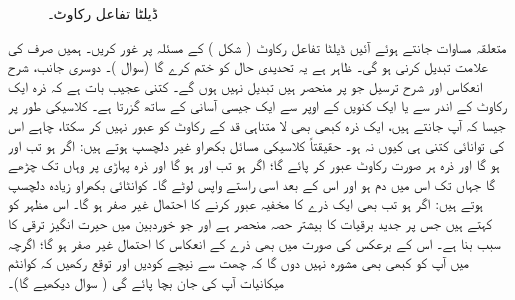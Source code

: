  \begin{figure}
\centering
{}
\caption{ڈیلٹا تفاعل رکاوٹ۔}
\label{شکل_غیر_تابع_ڈیلٹا_تفاعل_رکاوٹ}
\end{figure}
متعلقہ مساوات جانتے ہوئے آئیں ڈیلٹا تفاعل رکاوٹ ( شکل ) کے مسئلہ پر غور کریں۔ ہمیں صرف  کی علامت تبدیل کرنی ہو گی۔ ظاہر ہے یہ تحدیدی حال کو ختم کرے گا (سوال )۔ دوسری جانب، شرح انعکاس اور شرح ترسیل جو  پر منحصر ہیں تبدیل نہیں ہوں گے۔ کتنی عجیب بات ہے کہ  ذرہ ایک رکاوٹ کے اندر سے یا ایک کنویں  کے اوپر سے ایک جیسی آسانی کے ساتھ گزرتا ہے۔ کلاسیکی طور پر جیسا کہ آپ جانتے ہیں، ایک ذرہ کبھی بھی لا متناہی قد کے رکاوٹ کو عبور نہیں کر سکتا، چاہے اس کی توانائی کتنی ہی کیوں نہ ہو۔ حقیقتاً کلاسیکی مسائل بکھراو غیر دلچسپ ہوتے ہیں: اگر  ہو تب  اور  ہو گا اور ذرہ ہر صورت رکاوٹ عبور کر پائے گا؛ اگر  ہو تب  اور  ہو گا اور ذرہ پہاڑی پر وہاں تک چڑھے گا جہاں تک اس میں دم ہو اور اس کے بعد اسی راستے واپس لوٹے گا۔ کوانٹائی بکھراو زیادہ دلچسپ ہوتے ہیں: اگر  ہو تب بھی ایک ذرے کا مخفیہ عبور کرنے کا احتمال غیر صفر ہو گا۔ اس مظہر کو  کہتے ہیں جس پر جدید برقیات کا بیشتر حصہ منحصر ہے اور جو خوردبین میں حیرت انگیز ترقی کا سبب بنا ہے۔ اس کے برعکس  کی صورت میں بھی ذرے کے انعکاس کا احتمال غیر صفر ہو گا؛ اگرچہ میں آپ کو کبھی بھی مشورہ نہیں دوں گا کہ چھت سے نیچے کودیں اور توقع رکھیں کہ کوانٹم میکانیات آپ کی جان بچا پائے گی ( سوال  دیکھیے گا)۔
 
